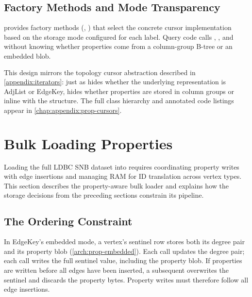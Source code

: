 \subsection{Factory Methods and Mode Transparency}
\label{arch:prop-cursors:factory}

 provides factory methods (, ) that select the concrete cursor implementation based on the storage mode configured for each label.
Query code calls , , and  without knowing whether properties come from a column-group B-tree or an embedded blob.

This design mirrors the topology cursor abstraction described in \autoref{appendix:iterators}: just as  hides whether the underlying representation is AdjList or EdgeKey,  hides whether properties are stored in column groups or inline with the structure.
The full class hierarchy and annotated code listings appear in \autoref{chap:appendix:prop-cursors}.

\section{Bulk Loading Properties}
\label{arch:prop-bulk-load}

Loading the full LDBC SNB dataset into \project{} requires coordinating property writes with edge insertions and managing RAM for ID translation across vertex types.
This section describes the property-aware bulk loader and explains how the storage decisions from the preceding sections constrain its pipeline.

\subsection{The Ordering Constraint}
\label{arch:prop-bulk:ordering}

In EdgeKey's embedded mode, a vertex's sentinel row stores both its degree pair and its property blob (\autoref{arch:prop-embedded}).
Each  call updates the degree pair; each  call writes the full sentinel value, including the property blob.
If properties are written before all edges have been inserted, a subsequent  overwrites the sentinel and discards the property bytes.
Property writes must therefore follow all edge insertions.

